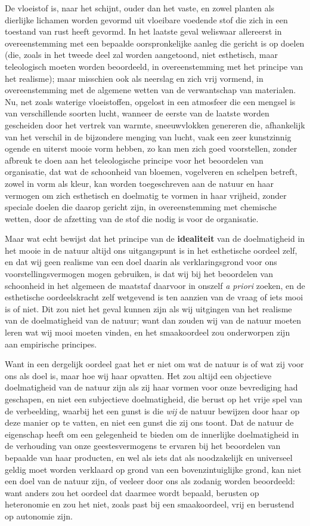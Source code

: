 De vloeistof is, naar het schijnt, ouder dan het vaste, en zowel planten als dierlijke lichamen worden gevormd uit vloeibare voedende stof die zich in een toestand van rust heeft gevormd. In het laatste geval weliswaar allereerst in overeenstemming met een bepaalde oorspronkelijke aanleg die gericht is op doelen (die, zoals in het tweede deel zal worden aangetoond, niet esthetisch, maar teleologisch moeten worden beoordeeld, in overeenstemming met het principe van het realisme); maar misschien ook als neerslag en zich vrij vormend, in overeenstemming met de algemene wetten van de verwantschap van materialen. Nu, net zoals waterige vloeistoffen, opgelost in een atmosfeer die een mengsel is van verschillende soorten lucht, wanneer de eerste van de laatste worden gescheiden door het vertrek van warmte, sneeuwvlokken genereren die, afhankelijk van het verschil in de bijzondere menging van lucht, vaak een zeer kunstzinnig ogende en uiterst mooie vorm hebben, zo kan men zich goed voorstellen, zonder afbreuk te doen aan het teleologische principe voor het beoordelen van organisatie, dat wat de schoonheid van bloemen, vogelveren en schelpen betreft, zowel in vorm als kleur, kan worden toegeschreven aan de natuur en haar vermogen om zich esthetisch en doelmatig te vormen in haar vrijheid, zonder speciale doelen die daarop gericht zijn, in overeenstemming met chemische wetten, door de afzetting van de stof die nodig is voor de organisatie.

Maar wat echt bewijst dat het principe van de \textbf{idealiteit} van de doelmatigheid in het mooie in de natuur altijd ons uitgangspunt is in het esthetische oordeel zelf, en dat wij geen realisme van een doel daarin als verklaringsgrond voor ons voorstellingsvermogen mogen gebruiken, is dat wij bij het beoordelen van schoonheid in het algemeen de maatstaf daarvoor in onszelf \textit{a priori} zoeken, en de esthetische oordeelskracht zelf wetgevend is ten aanzien van de vraag of iets mooi is of niet. Dit zou niet het geval kunnen zijn als wij uitgingen van het realisme van de doelmatigheid van de natuur; want dan zouden wij van de natuur moeten leren wat wij mooi moeten vinden, en het smaakoordeel zou onderworpen zijn aan empirische principes.

Want in een dergelijk oordeel gaat het er niet om wat de natuur is of wat zij voor ons als doel is, maar hoe wij haar opvatten. Het zou altijd een objectieve doelmatigheid van de natuur zijn als zij haar vormen voor onze bevrediging had geschapen, en niet een subjectieve doelmatigheid, die berust op het vrije spel van de verbeelding, waarbij het een gunst is die \textit{wij} de natuur bewijzen door haar op deze manier op te vatten, en niet een gunst die zij ons toont. Dat de natuur de eigenschap heeft om een gelegenheid te bieden om de innerlijke doelmatigheid in de verhouding van onze geestesvermogens te ervaren bij het beoordelen van bepaalde van haar producten, en wel als iets dat als noodzakelijk en universeel geldig moet worden verklaard op grond van een bovenzintuiglijke grond, kan niet een doel van de natuur zijn, of veeleer door ons als zodanig worden beoordeeld: want anders zou het oordeel dat daarmee wordt bepaald, berusten op heteronomie en zou het niet, zoals past bij een smaakoordeel, vrij en berustend op autonomie zijn.

